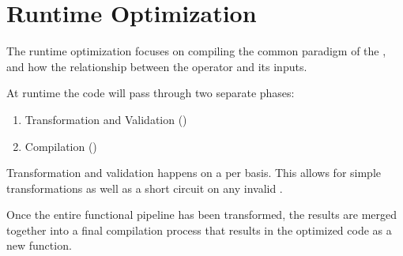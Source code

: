 \section{Runtime Optimization}\label{RuntimeOptimization}
The runtime optimization focuses on compiling the common paradigm of the \pipelineoperators, and how the relationship between the operator and its inputs.

At runtime the code will pass through two separate phases:

\begin{enumerate}
  \item Transformation and Validation ()
  \item Compilation ()
\end{enumerate}

Transformation and validation happens on a per \pipelineoperator basis.  This allows for simple transformations as well as a short circuit on any invalid \pipelineoperator.

Once the entire functional pipeline has been transformed, the results are merged together into a final compilation process that results in the optimized code as a new function. 

\begin{minipage}{\linewidth}

\end{minipage}


